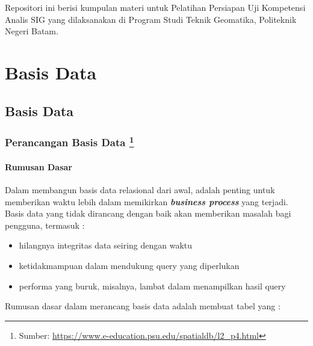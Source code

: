 \documentclass[]{book}
\providecommand{\tightlist}{%
  \setlength{\itemsep}{0pt}\setlength{\parskip}{0pt}}
\let\rmarkdownfootnote\footnote%
\def\footnote{\protect\rmarkdownfootnote}
\begin{document}
Repositori ini berisi kumpulan materi untuk Pelatihan Persiapan Uji Kompetensi Analis SIG yang dilaksanakan di Program Studi Teknik Geomatika, Politeknik Negeri Batam.

\hypertarget{part-basis-data}{%
\part{Basis Data}\label{part-basis-data}}

\hypertarget{day2}{%
\chapter{Basis Data}\label{day2}}

\hypertarget{perancangan-basis-data}{%
\section[Perancangan Basis Data ]{\texorpdfstring{Perancangan Basis Data \footnote{Sumber: \url{https://www.e-education.psu.edu/spatialdb/l2_p4.html}}}{Perancangan Basis Data }}\label{perancangan-basis-data}}

\hypertarget{rumusan-dasar}{%
\subsection{Rumusan Dasar}\label{rumusan-dasar}}

Dalam membangun basis data relasional dari awal, adalah penting untuk memberikan waktu lebih dalam memikirkan \textbf{\emph{business process}} yang terjadi. Basis data yang tidak dirancang dengan baik akan memberikan masalah bagi pengguna, termasuk :

\begin{itemize}
\tightlist
\item
  hilangnya integritas data seiring dengan waktu
\item
  ketidakmampuan dalam mendukung query yang diperlukan
\item
  performa yang buruk, misalnya, lambat dalam menampilkan hasil query
\end{itemize}

Rumusan dasar dalam merancang basis data adalah membuat tabel yang :
\end{document}
